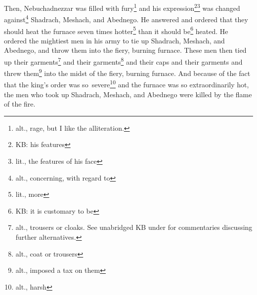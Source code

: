 \begin{inparaenum}
     Then, Nebuchadnezzar was filled with fury\footnote{alt., rage, but I like the alliteration.} and his expression\footnote{KB: his features}\footnote{lit., the features of his face} was changed against\footnote{alt., concerning, with regard to} Shadrach, Meshach, and Abednego. He answered and ordered that they should heat the furnace seven times hotter\footnote{lit., more} than it should be\footnote{KB: it is customary to be} heated.%
     He ordered the mightiest men in his army to tie up Shadrach, Meshach, and Abednego, and throw them into the fiery, burning furnace.%
     These men then tied up their garments\footnote{alt., trousers or cloaks. See unabridged KB under  for commentaries discussing further alternatives.} and their garments\footnote{alt., coat or trousers} and their caps and their garments and threw them\footnote{alt., imposed a tax on them} into the midst of the fiery, burning furnace.%
     And because of the fact that the king's order was so\understood\ severe\footnote{alt., harsh} and the furnace was so extraordinarily hot, the men who took up Shadrach, Meshach, and Abednego were killed by the flame of the fire.%
    
    
    
\end{inparaenum}
